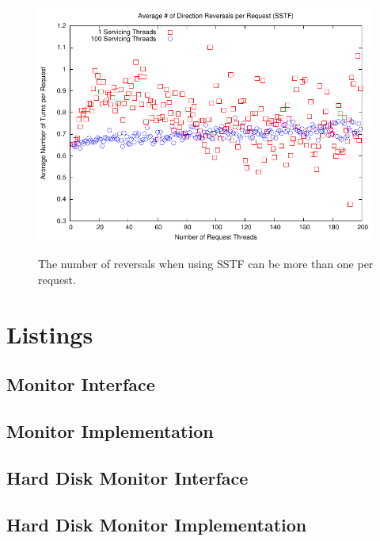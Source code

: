 \documentclass{report}
\begin{document}
\begin{figure}[htb!]
    \centering
    \includegraphics[scale=1]{turnsSSTF.pdf}
    \label{fig:turnsSSTF}
    \caption{The number of reversals when using SSTF can be more than one per request.}
\end{figure}


\newpage
\section{Listings} %
\subsection{Monitor Interface}

\subsection{Monitor Implementation}

\subsection{Hard Disk Monitor Interface}

\subsection{Hard Disk Monitor Implementation}

\end{document}
